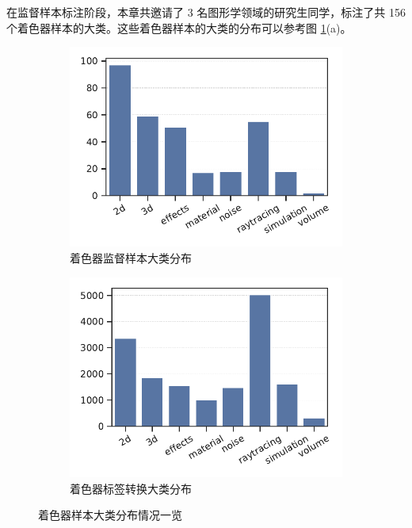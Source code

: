 {\added 在监督样本标注阶段，本章共邀请了 3 名图形学领域的研究生同学，标注了共 156 个着色器样本的大类。这些着色器样本的大类的分布可以参考图 \ref{fig:manualLabelResultAndCVT_ch3}(a)。}

\begin{figure}[h]
    \centering
    \begin{minipage}[b]{\textwidth}
        \begin{subfigure}[b]{0.5\textwidth}
            \includegraphics[width=\textwidth]{figures/ManualLabelResult.pdf}
            \caption{着色器监督样本大类分布}
        \end{subfigure}
        \begin{subfigure}[b]{0.5\textwidth}
            \includegraphics[width=\textwidth]{figures/AuthorLabel.pdf}
            \caption{着色器标签转换大类分布}
        \end{subfigure}
    \end{minipage}

    \caption{着色器样本大类分布情况一览}
    \label{fig:manualLabelResultAndCVT_ch3}
\end{figure}

